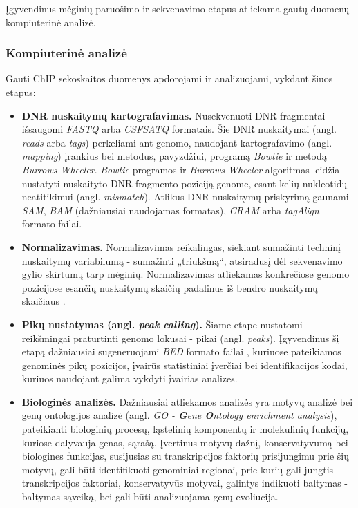\documentclass[12pt]{article}
\begin{document}
Įgyvendinus mėginių paruošimo ir sekvenavimo etapus atliekama gautų duomenų
kompiuterinė analizė.

\subsubsection{Kompiuterinė analizė}
Gauti ChIP sekoskaitos duomenys apdorojami ir analizuojami, vykdant šiuos
etapus:

\begin{itemize}
    \item \textbf{DNR nuskaitymų kartografavimas.} Nusekvenuoti DNR 
        fragmentai išsaugomi \emph{FASTQ} arba \emph{CSFSATQ} formatais. Šie DNR
        nuskaitymai (angl. \emph{reads} arba \emph{tags}) perkeliami ant genomo,
        naudojant kartografavimo (angl. \emph{mapping}) įrankius bei metodus,
        pavyzdžiui, programą \emph{Bowtie} \cite{ARTICLE6} ir metodą
        \emph{Burrows-Wheeler}. \emph{Bowtie} programos ir \emph{Burrows-Wheeler}
        algoritmas leidžia nustatyti nuskaityto DNR fragmento poziciją genome,
        esant kelių nukleotidų neatitikimui \cite{ARTICLE7}
        (angl. \emph{mismatch}). Atlikus DNR nuskaitymų priskyrimą gaunami
        \emph{SAM}, \emph{BAM} (dažniausiai naudojamas formatas), \emph{CRAM}
        arba \emph{tagAlign} formato failai.
    \item \textbf{Normalizavimas.} Normalizavimas reikalingas, siekiant
        sumažinti techninį nuskaitymų variabilumą - sumažinti „triukšmą“,
        atsiradusį dėl sekvenavimo gylio skirtumų tarp mėginių. Normalizavimas
        atliekamas konkrečiose genomo pozicijose esančių nuskaitymų skaičių
        padalinus iš bendro nuskaitymų skaičiaus \cite{ARTICLE17}.
    \item \textbf{Pikų nustatymas (angl. \emph{peak calling}).} Šiame etape
        nustatomi reikšmingai praturtinti genomo lokusai - pikai
        (angl. \emph{peaks}). Įgyvendinus šį etapą dažniausiai sugeneruojami
        \emph{BED} formato failai \cite{ARTICLE1}, kuriuose pateikiamos genominės
        pikų pozicijos, įvairūs statistiniai įverčiai bei identifikacijos kodai,
        kuriuos naudojant galima vykdyti įvairias analizes.
    \item \textbf{Biologinės analizės.} Dažniausiai atliekamos analizės yra
        motyvų analizė bei genų ontologijos analizė \cite{ARTICLE1}
        (angl. \emph{GO - \textbf{G}ene \textbf{O}ntology enrichment analysis}),
        pateikianti biologinių procesų, ląstelinių komponentų ir molekulinių
        funkcijų, kuriose dalyvauja genas, sąrašą. Įvertinus motyvų dažnį,
        konservatyvumą bei biologines funkcijas, susijusias su transkripcijos
        faktorių prisijungimu prie šių motyvų, gali būti identifikuoti
        genominiai regionai, prie kurių gali jungtis transkripcijos faktoriai,
        konservatyvūs motyvai, galintys indikuoti baltymas - baltymas sąveiką,
        bei gali būti analizuojama genų evoliucija.
\end{itemize}
\end{document}
